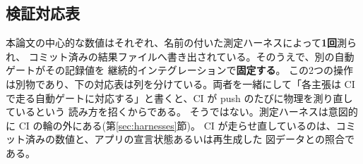\documentclass[a4paper,10pt,twocolumn]{ltjsarticle}
\begin{document}
\subsection{検証対応表}
\label{sec:map}

本論文の中心的な数値はそれぞれ、名前の付いた測定ハーネスによって\textbf{1回}測られ、
コミット済みの結果ファイルへ書き出されている。そのうえで、別の自動ゲートがその記録値を
継続的インテグレーションで\textbf{固定する}。
この2つの操作は別物であり、下の対応表は列を分けている。両者を一緒にして「各主張は
CI で走る自動ゲートに対応する」と書くと、CI が push のたびに物理を測り直しているという
読み方を招くからである。
そうではない。測定ハーネスは意図的に CI の輪の外にある(第\ref{sec:harnesses}節)。
CI が走らせ直しているのは、コミット済みの数値と、アプリの宣言状態あるいは再生成した
図データとの照合である。
\end{document}
